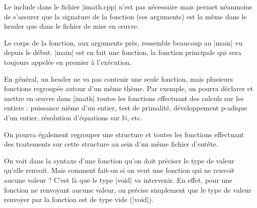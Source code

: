 Le include dans le fichier |imath.cpp| n'est pas nécessaire mais permet néanmoins
de s'assurer que la signature de la fonction (ses arguments) est la même dans le
header que dans le fichier de mise en {\oe}uvre.

Le corps de la fonction, aux arguments près, ressemble beaucoup au |main| vu depuis le début. |main| est en fait une fonction, la fonction principale qui sera toujours appelée
en premier à l'exécution.

En général, un header ne va pas contenir une seule fonction, mais plusieurs fonctions
regroupée autour d'un même thème. Par exemple, on pourra déclarer et mettre en {\oe}uvre
dans |imath| toutes les fonctions effectuant des calculs sur les entiers : puissance nième d'un entier, test de primalité, développement p-adique d'un entier, résolution d'équations sur $\mathbb{N}$, etc.

On pourra également regrouper une structure et toutes les fonctions effectuant des traitements sur cette structure au sein d'un même fichier d'entête.

On voit dans la syntaxe d'une fonction qu'on doit préciser le type de valeur qu'elle renvoit. Mais
comment fait-on si on veut une fonction qui ne renvoit aucune valeur ? C'est là que le type |void|
va intervenir. En effet, pour une fonction ne renvoyant aucune valeur, on précise simplement que
le type de valeur renvoyer par la fonction est de type vide (|void|).

